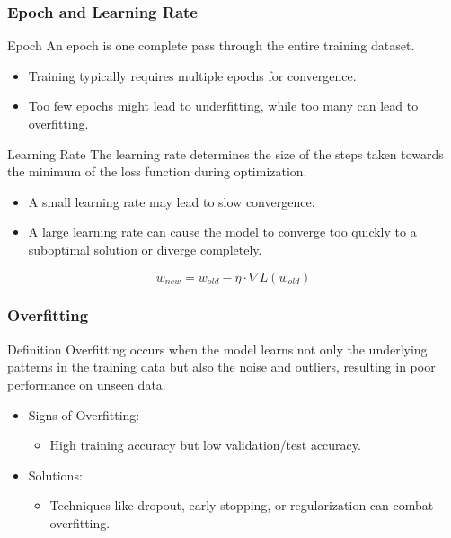 \documentclass[aspectratio=169]{beamer}
\begin{document}
\begin{frame}[fragile]
    \frametitle{Epoch and Learning Rate}

    \begin{block}{Epoch}
        An epoch is one complete pass through the entire training dataset.
    \end{block}

    \begin{itemize}
        \item Training typically requires multiple epochs for convergence.
        \item Too few epochs might lead to underfitting, while too many can lead to overfitting.
    \end{itemize}

    \begin{block}{Learning Rate}
        The learning rate determines the size of the steps taken towards the minimum of the loss function during optimization.
    \end{block}

    \begin{itemize}
        \item A small learning rate may lead to slow convergence.
        \item A large learning rate can cause the model to converge too quickly to a suboptimal solution or diverge completely.
    \end{itemize}

    \begin{equation}
    w_{new} = w_{old} - \eta \cdot \nabla L(w_{old})
    \end{equation}
\end{frame}

\begin{frame}[fragile]
    \frametitle{Overfitting}

    \begin{block}{Definition}
        Overfitting occurs when the model learns not only the underlying patterns in the training data but also the noise and outliers, resulting in poor performance on unseen data.
    \end{block}

    \begin{itemize}
        \item Signs of Overfitting:
        \begin{itemize}
            \item High training accuracy but low validation/test accuracy.
        \end{itemize}
        \item Solutions:
        \begin{itemize}
            \item Techniques like dropout, early stopping, or regularization can combat overfitting.
        \end{itemize}
    \end{itemize}
\end{frame}
\end{document}
